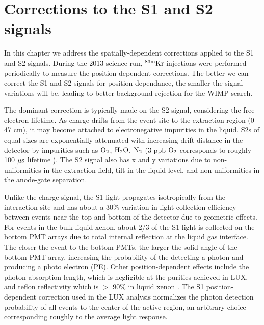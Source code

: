 
\renewcommand{\thechapter}{3}
\newcommand{\KrCal}{$\rm^{83m}Kr \: $}
\newcommand{\Rb}{$\rm^{83}Rb \: $}

\chapter{Corrections to the S1 and S2 signals}
\label{Ch:3}

In this chapter we address the spatially-dependent corrections applied to the S1 and S2 signals. During the 2013 science run, \KrCal injections were performed periodically to measure the position-dependent corrections. The better we can correct the S1 and S2 signals for position-dependance, the smaller the signal variations will be, leading to better background rejection for the WIMP search. 


The dominant correction is typically made on the S2 signal, considering the free electron lifetime. As charge drifts from the event site to the extraction region (0-47 cm), it may become attached to electronegative impurities in the liquid. S2s of equal sizes are exponentially attenuated with increasing drift distance in the detector by impurities such as $\rm O_2$, $\rm H_2O$, $\rm N_2$ (3 ppb $\rm O_2$ corresponds to roughly 100 $\rm \mu s$ lifetime \cite{GPM}). The S2 signal also has x and y variations due to non-uniformities in the extraction field, tilt in the liquid level, and non-uniformities in the anode-gate separation. 


Unlike the charge signal, the S1 light propagates isotropically from the interaction site and has about a 30\% variation in light collection efficiency between events near the top and bottom of the detector due to geometric effects. For events in the  bulk liquid xenon, about 2/3 of the S1 light is collected on the bottom PMT arrays due to total internal reflection at the liquid gas interface. The closer the event to the bottom PMTs, the larger the solid angle of the bottom PMT array, increasing the probability of the detecting a photon and producing a photo electron (PE). Other position-dependent effects include the photon absorption length, which is negligible at the purities achieved in LUX, and teflon reflectivity which is $>$ 90\% in liquid xenon \cite{Teflon_R_1} \cite{Teflon_R_2}. The S1 position-dependent correction used in the LUX analysis normalizes the photon detection probability of all events to the center of the active region, an arbitrary choice corresponding roughly to the average light response.

